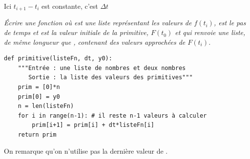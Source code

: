 Ici $t_{i+1} - t_i$ est constante, c'est $\Delta t$
\begin{Exercise}\it 
Écrire une fonction  où  est une liste représentant les valeurs de $f(t_i)$,  est le pas de temps et  est la valeur initiale de la primitive, $F(t_0)$ et qui renvoie une liste, de même longueur que , contenant des valeurs approchées de $F(t_i)$.
\end{Exercise}
\begin{Answer}
\begin{lstlisting}
def primitive(listeFn, dt, y0):
    """Entrée : une liste de nombres et deux nombres
       Sortie : la liste des valeurs des primitives"""
    prim = [0]*n
    prim[0] = y0
    n = len(listeFn)
    for i in range(n-1): # il reste n-1 valeurs à calculer
        prim[i+1] = prim[i] + dt*listeFn[i]
    return prim
\end{lstlisting}
\end{Answer}
On remarque qu'on n'utilise pas la dernière valeur de .

\medskip

